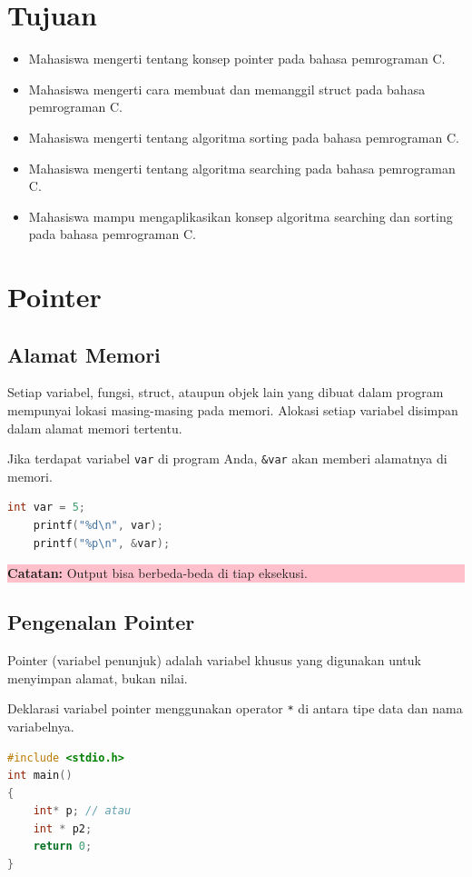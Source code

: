 \section{Tujuan}
\begin{itemize}[label=$\bullet$, itemsep=-1pt, leftmargin=*]
    \item Mahasiswa mengerti tentang konsep pointer pada bahasa pemrograman C.
    \item Mahasiswa mengerti cara membuat dan memanggil struct pada bahasa pemrograman C.
    \item Mahasiswa mengerti tentang algoritma sorting pada bahasa pemrograman C.
    \item Mahasiswa mengerti tentang algoritma searching pada bahasa pemrograman C.
    \item Mahasiswa mampu mengaplikasikan konsep algoritma searching dan sorting pada bahasa pemrograman C.
\end{itemize}

\section{Pointer}
\subsection{Alamat Memori}
Setiap variabel, fungsi, struct, ataupun objek lain yang dibuat dalam program mempunyai lokasi masing-masing pada memori. Alokasi setiap variabel disimpan dalam alamat memori tertentu.

Jika  terdapat variabel \verb|var| di program Anda, \verb|&var| akan memberi alamatnya di memori.
\begin{lstlisting}[language=c]
    int var = 5;
    printf("%d\n", var);
    printf("%p\n", &var);
\end{lstlisting}
\begin{center}
    \colorbox{pink}{\parbox{0.8\linewidth}{\textbf{Catatan:} Output bisa berbeda-beda di tiap eksekusi.}}
\end{center}

\subsection{Pengenalan Pointer}

Pointer (variabel penunjuk) adalah variabel khusus yang digunakan untuk menyimpan alamat, bukan nilai.

Deklarasi variabel pointer menggunakan operator \verb|*| di antara tipe data dan nama variabelnya.
\begin{lstlisting}[language=c]
	#include <stdio.h>
int main()
{
	int* p; // atau
    int * p2;
	return 0;
}
\end{lstlisting}


